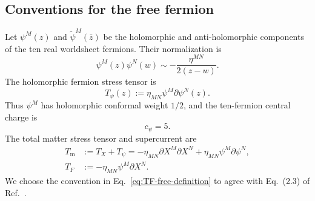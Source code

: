 \documentclass[12pt]{article}
\numberwithin{equation}{section}
\newcommand{\TF}{T_{F}}
\newcommand{\Tmat}{T_{\mathrm m}}
\begin{document}
\subsection{Conventions for the free fermion}
\label{sec:free-fermion}

Let $\psi^M(z)$ and $\widetilde\psi^M(\bar z)$ be the holomorphic and
anti-holomorphic components of the ten real worldsheet fermions.  Their
normalization is
\begin{equation}
\psi^M(z)\psi^N(w)
\sim
-\frac{\eta^{MN}}{2(z-w)}.
\label{eq:psi-psi-ope}
\end{equation}
The holomorphic fermion stress tensor is
\begin{equation}
T_\psi(z):=\eta_{MN}\psi^M\partial\psi^N(z).
\label{eq:Tpsi-definition}
\end{equation}
Thus $\psi^M$ has holomorphic conformal weight $1/2$, and the ten-fermion
central charge is
\begin{equation}
c_\psi=5.
\label{eq:cpsi}
\end{equation}
The total matter stress tensor and supercurrent are
\begin{align}
\Tmat
&:=T_X+T_\psi
=-\eta_{MN}\partial X^M\partial X^N
+\eta_{MN}\psi^M\partial\psi^N,
\label{eq:Tm-free-definition}
\\
\TF
&:=-\eta_{MN}\psi^M\partial X^N.
\label{eq:TF-free-definition}
\end{align}
We choose the convention in Eq.~\eqref{eq:TF-free-definition} to agree with
Eq.~(2.3) of Ref.~\cite{Sen:2021tpp}.
\end{document}
